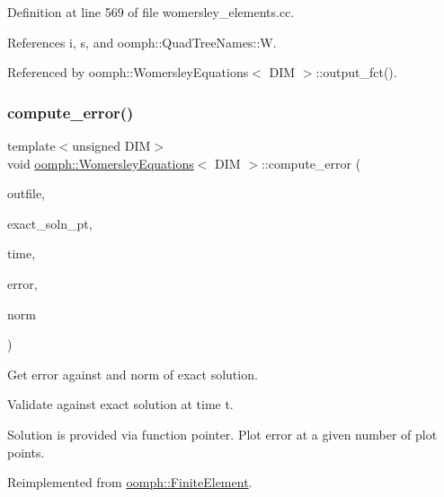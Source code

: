 Definition at line 569 of file womersley\+\_\+elements.\+cc.



References i, s, and oomph\+::\+Quad\+Tree\+Names\+::W.



Referenced by oomph\+::\+Womersley\+Equations$<$ D\+I\+M $>$\+::output\+\_\+fct().

\mbox{\label{classoomph_1_1WomersleyEquations_a5db020d180881321f3dbd18e2971c407}} 
\subsubsection{\texorpdfstring{compute\+\_\+error()}{compute\_error()}\hspace{0.1cm}{\footnotesize\ttfamily [2/2]}}
{\footnotesize\ttfamily template$<$unsigned D\+IM$>$ \\
void \hyperlink{classoomph_1_1WomersleyEquations}{oomph\+::\+Womersley\+Equations}$<$ D\+IM $>$\+::compute\+\_\+error (\begin{DoxyParamCaption}\item[{std\+::ostream \&}]{outfile,  }\item[{\hyperlink{classoomph_1_1FiniteElement_ad4ecf2b61b158a4b4d351a60d23c633e}{Finite\+Element\+::\+Unsteady\+Exact\+Solution\+Fct\+Pt}}]{exact\+\_\+soln\+\_\+pt,  }\item[{const double \&}]{time,  }\item[{double \&}]{error,  }\item[{double \&}]{norm }\end{DoxyParamCaption})\hspace{0.3cm}{\ttfamily [virtual]}}



Get error against and norm of exact solution. 

Validate against exact solution at time t.

Solution is provided via function pointer. Plot error at a given number of plot points. 

Reimplemented from \hyperlink{classoomph_1_1FiniteElement_a7f67853506dc73fa6b7505108de22d1f}{oomph\+::\+Finite\+Element}.



